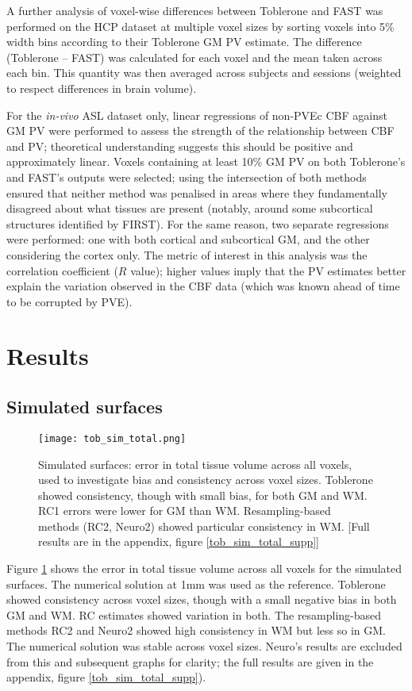 A further analysis of voxel-wise differences between Toblerone and FAST was performed on the HCP dataset at multiple voxel sizes by sorting voxels into 5\% width bins according to their Toblerone GM PV estimate. The difference (Toblerone – FAST) was calculated for each voxel and the mean taken across each bin. This quantity was then averaged across subjects and sessions (weighted to respect differences in brain volume).

For the \textit{in-vivo} ASL dataset only, linear regressions of non-PVEc CBF against GM PV were performed to assess the strength of the relationship between CBF and PV; theoretical understanding suggests this should be positive and approximately linear. Voxels containing at least 10\% GM PV on both Toblerone's and FAST's outputs were selected; using the intersection of both methods ensured that neither method was penalised in areas where they fundamentally disagreed about what tissues are present (notably, around some subcortical structures identified by FIRST). For the same reason, two separate regressions were performed: one with both cortical and subcortical GM, and the other considering the cortex only. The metric of interest in this analysis was the correlation coefficient ($R$ value); higher values imply that the PV estimates better explain the variation observed in the CBF data (which was known ahead of time to be corrupted by PVE). 

\section{Results}

\subsection{Simulated surfaces}

\begin{figure}[H]
\centering
\texttt{[image: tob\_sim\_total.png]}
\caption{Simulated surfaces: error in total tissue volume across all voxels, used to investigate bias and consistency across voxel sizes. Toblerone showed consistency, though with small bias, for both GM and WM. RC1 errors were lower for GM than WM. Resampling-based methods (RC2, Neuro2) showed particular consistency in WM. [Full results are in the appendix, figure \ref{tob_sim_total_supp}]}
\label{tob_sim_total}
\end{figure}

Figure \ref{tob_sim_total} shows the error in total tissue volume across all voxels for the simulated surfaces. The numerical solution at 1mm was used as the reference. Toblerone showed consistency across voxel sizes, though with a small negative bias in both GM and WM. RC estimates showed variation in both. The resampling-based methods RC2 and Neuro2 showed high consistency in WM but less so in GM. The numerical solution was stable across voxel sizes. Neuro’s results are excluded from this and subsequent graphs for clarity; the full results are given in the appendix, figure \ref{tob_sim_total_supp}). 

